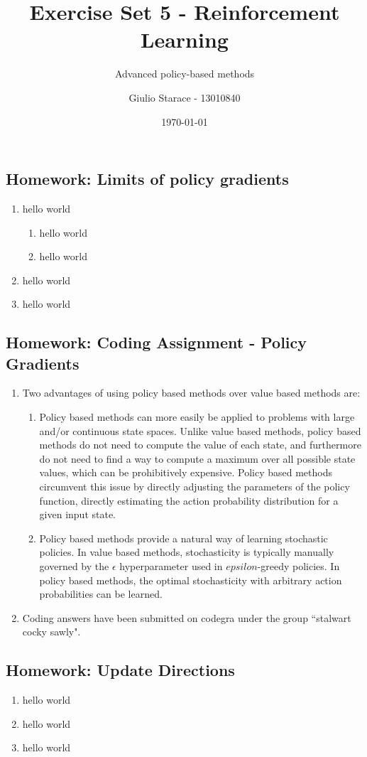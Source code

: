 \documentclass{article}
\title{Exercise Set 5 - Reinforcement Learning}
\subtitle{Advanced policy-based methods}
\author{Giulio Starace - 13010840}
\date{\today}
\begin{document}
\maketitle
\setcounter{section}{9}
\setcounter{subsection}{3}
\subsection{Homework: Limits of policy gradients}
\begin{enumerate}
	\item hello world
	      \begin{enumerate}
		      \item hello world
		      \item hello world
	      \end{enumerate}
	\item hello world
	\item hello world
\end{enumerate}

\subsection{Homework: Coding Assignment - Policy Gradients}
\begin{enumerate}
	\item Two advantages of using policy based methods over value based methods are:
	      \begin{enumerate}
		      \item Policy based methods can more easily be applied to problems with large and/or
		            continuous state spaces. Unlike value based methods, policy based methods do not
		            need to compute the value of each state, and furthermore do not need to find a way
		            to compute a maximum over all possible state values, which can be prohibitively
		            expensive. Policy based methods circumvent this issue by directly adjusting the
		            parameters of the policy function, directly estimating the action probability
		            distribution for a given input state.
		      \item Policy based methods provide a natural way of learning stochastic policies. In value
		            based methods, stochasticity is typically manually governed by the $\epsilon$
		            hyperparameter used in $epsilon$-greedy policies. In policy based methods, the optimal
		            stochasticity with arbitrary action probabilities can be learned.
	      \end{enumerate}
	\item Coding answers have been submitted on codegra under the group ``stalwart cocky sawly".
\end{enumerate}

\setcounter{section}{10}
\setcounter{subsection}{2}
\subsection{Homework: Update Directions}
\begin{enumerate}
	\item hello world
	\item hello world
	\item hello world
\end{enumerate}
\end{document}
